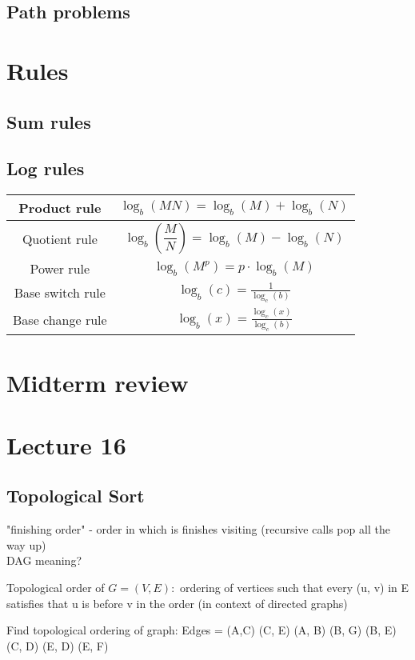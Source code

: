 \documentclass{article}
\begin{document}
\subsection{Path problems}



\section{Rules}
\subsection{Sum rules}
\subsection{Log rules}
\begin{tabular}{|c|c|}
    \hline
    Product rule & $\log_b(MN)=\log_b(M)+\log_b(N)$ \\
    \hline
    Quotient rule & $\log_b\left(\dfrac{M}{N}\right)=\log_b(M)-\log_b(N)$ \\
    \hline Power rule & $\log_b(M^p)=p\cdot\log_b(M)$\\
    \hline Base switch rule & $\log_b(c)=\frac{1}{\log_c(b)}$\\
    \hline Base change rule & $\log_b(x)=\frac{\log_c(x)}{\log_c(b)}$\\
    \hline
    \end{tabular}


\section{Midterm review}


\section{Lecture 16}
\subsection{Topological Sort}
"finishing order" - order in which is finishes visiting (recursive calls pop all the way up)\\
DAG meaning?\\
\begin{definition}
    Topological order of $G = (V, E):$ ordering of vertices such that every (u, v) in E satisfies that u is before v in the order (in context of directed graphs)
\end{definition}
Find topological ordering of graph:
Edges = (A,C)
(C, E)
(A, B)
(B, G)
(B, E)
(C, D)
(E, D)
(E, F)
\end{document}
